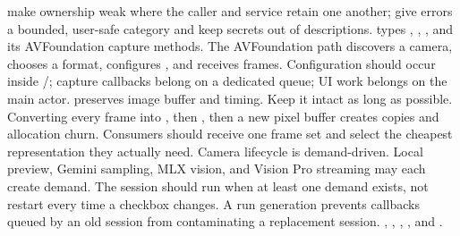 \markdownRendererUlItem make ownership weak where the caller and service retain one another;\markdownRendererUlItemEnd 
\markdownRendererUlItem give errors a bounded, user-safe category and keep secrets out of descriptions.\markdownRendererUlItemEnd 
\markdownRendererUlEnd \markdownRendererInterblockSeparator
{}
\markdownRendererSectionEnd \markdownRendererSectionBegin
{}\markdownRendererInterblockSeparator
{}\markdownRendererBlockQuoteBegin
{}  types , , , and its AVFoundation capture methods.\markdownRendererBlockQuoteEnd \markdownRendererInterblockSeparator
{}The AVFoundation path discovers a camera, chooses a format, configures , and receives  frames. Configuration should occur inside /; capture callbacks belong on a dedicated queue; UI work belongs on the main actor.\markdownRendererParagraphSeparator
{} preserves image buffer and timing. Keep it intact as long as possible. Converting every frame into , then , then a new pixel buffer creates copies and allocation churn. Consumers should receive one frame set and select the cheapest representation they actually need.\markdownRendererParagraphSeparator
{}Camera lifecycle is demand-driven. Local preview, Gemini sampling, MLX vision, and Vision Pro streaming may each create demand. The session should run when at least one demand exists, not restart every time a checkbox changes. A run generation prevents callbacks queued by an old session from contaminating a replacement session.\markdownRendererInterblockSeparator
{}
\markdownRendererSectionEnd \markdownRendererSectionBegin
{}\markdownRendererInterblockSeparator
{}\markdownRendererBlockQuoteBegin
{} , , , , and .\markdownRendererBlockQuoteEnd \markdownRendererInterblockSeparator
